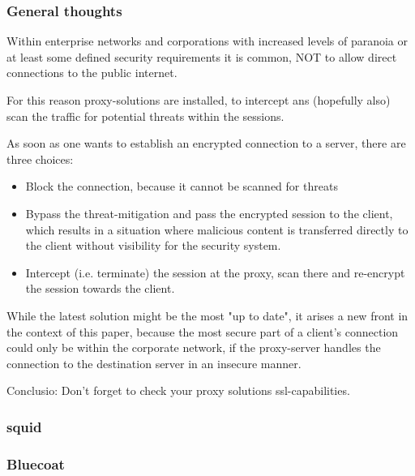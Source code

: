 
\subsubsection{General thoughts}

Within enterprise networks and corporations with increased levels of paranoia or at least some defined security requirements it is common, NOT to allow direct connections to the public internet.

For this reason proxy-solutions are installed, to intercept ans (hopefully also) scan the traffic for potential threats within the sessions.

As soon as one wants to establish an encrypted connection to a server, there are three choices:

\begin{itemize}
\item Block the connection, because it cannot be scanned for threats
\item Bypass the threat-mitigation and pass the encrypted session to the client, which results in a situation where malicious content is transferred directly to the client without visibility for the security system.
\item Intercept (i.e. terminate) the session at the proxy, scan there and re-encrypt the session towards the client.
\end{itemize}

While the latest solution might be the most "up to date", it arises a new front in the context of this paper, because the most secure part of a client's connection could only be within the corporate network, if the proxy-server handles the connection to the destination server in an insecure manner.

Conclusio: Don't forget to check your proxy solutions ssl-capabilities.

\subsubsection{squid}

\subsubsection{Bluecoat}

